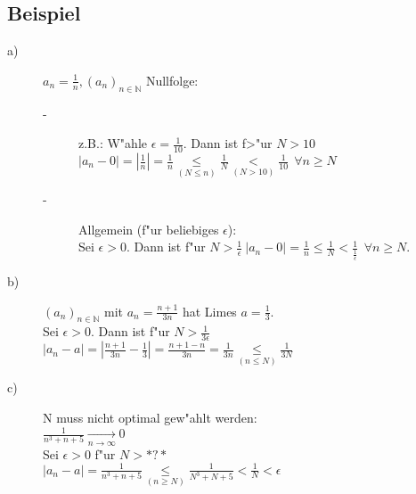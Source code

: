 \documentclass[12pt,a4paper]{article}
\begin{document}
\subsection{Beispiel}
\begin{description}
\item[a)]
$a_n = \frac{1}{n}, (a_n)_{n \in \mathbb{N}}$ Nullfolge:
\begin{description}
\item[-]
z.B.: W"ahle $\epsilon = \frac{1}{10}$. Dann ist f>"ur $N > 10$ \\
$ | a_n - 0 | = | \frac{1}{n} | = \frac{1}{n} \underset{(N \leq n)}{\leq} \frac{1}{N} \underset{(N>10)}{<} \frac{1}{10} ~ ~ \forall n \geq N$
\item[-]
Allgemein (f"ur beliebiges $\epsilon$): \\
Sei $\epsilon > 0$. Dann ist f"ur $N > \frac{1}{\epsilon} ~ |a_n - 0 | = \frac{1}{n} \leq \frac{1}{N} < \frac{1}{\frac{1}{\epsilon}} ~ ~ \forall n \geq N$.
\end{description}
\item[b)]
$(a_n)_{n \in \mathbb{N}}$ mit $a_n = \frac{n+1}{3n}$ hat Limes $a = \frac{1}{3}$. \\
Sei $\epsilon > 0$. Dann ist f"ur $N > \frac{1}{3 \epsilon}$ \\
$ | a_n -a | = | \frac{n+1}{3n} - \frac{1}{3} | = \frac{n+1-n}{3n} = \frac{1}{3n} \underset{(n \leq N)}{\leq} \frac{1}{3N}$
\item[c)]
N muss nicht optimal gew"ahlt werden: \\
$\frac{1}{n^3+n+5} \underset{n \rightarrow \infty}{\rightarrow} 0$ \\
Sei $\epsilon > 0$ f"ur $N > *?*$ \\
$| a_n - a | = \frac{1}{n^3+n+5} \underset{(n \geq N)}{\leq} \frac{1}{N^3 + N + 5} < \frac{1}{N} < \epsilon$
\end{description}
\end{document}
